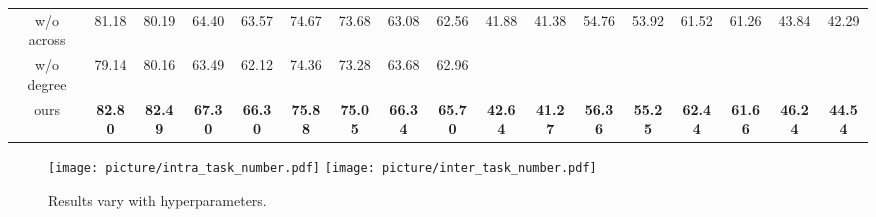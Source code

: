 \begin{table*}[ht]
{\begin{tabular}{@{}c|cccccccc|cccccccc@{}}
w/o across               & 81.18            & 80.19            & 64.40              & 63.57             & 74.67          & 73.68          & 63.08          & 62.56          & 41.88                    & 41.38                    & 54.76                    & 53.92                    & 61.52                    & 61.26                   & 43.84                    & 42.29                   \\
w/o degree               & 79.14            & 80.16            & 63.49              & 62.12             & 74.36          & 73.28          & 63.68          & 62.96          & \color{gray}{30.89}                   & \color{gray}{21.05}                    & \color{gray}{32.82}                    & \color{gray}{23.07}                    & \color{gray}{31.12}                    & \color{gray}{21.61}                   & \color{gray}{30.44}                    & \color{gray}{21.08}                   \\
ours                     & \textbf{82.80}   & \textbf{82.49}   & \textbf{67.30}     & \textbf{66.30}    & \textbf{75.88} & \textbf{75.05} & \textbf{66.34} & \textbf{65.70} & \textbf{42.64}           & \textbf{41.27}           & \textbf{56.36}           & \textbf{55.25}           & \textbf{62.44}           & \textbf{61.66}          & \textbf{46.24}           & \textbf{44.54}          \\ \bottomrule
\end{tabular}%
}
\end{table*}

\begin{figure}
    \centering
    \texttt{[image: picture/intra\_task\_number.pdf]}
    \texttt{[image: picture/inter\_task\_number.pdf]}
    \caption{Results vary %
    with hyperparameters.}%
    \label{hyper}
\end{figure}

